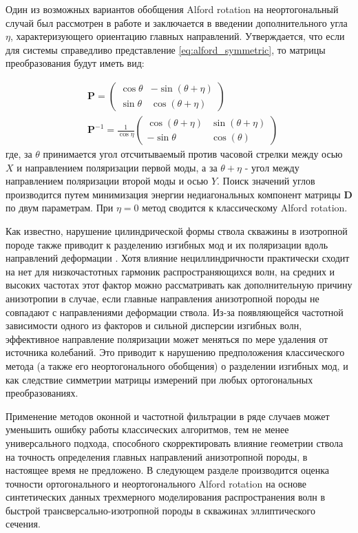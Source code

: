 \documentclass[a4paper,11pt]{article}
\begin{document}
Один из возможных вариантов обобщения Alford rotation на неортогональный случай был рассмотрен в работе \cite{Dellinger1998} и заключается в введении дополнительного угла $\eta$, характеризующего ориентацию главных направлений. Утверждается, что если для системы справедливо представление \eqref{eq:alford_symmetric}, то матрицы преобразования будут иметь вид:

\begin{align*}
&\mathbf{P} = \left(
\begin{array}{cc}
\cos \theta & -\sin (\theta+\eta) \\ 
\sin \theta & \cos (\theta+\eta)
\end{array} 
\right) \\
&\mathbf{P}^{-1} = \frac{1}{\cos \eta} \left(
\begin{array}{cc}
\cos (\theta+\eta) & \sin (\theta+\eta) \\ 
-\sin \theta & \cos (\theta)
\end{array} 
\right)
\end{align*}
где, за $\theta$ принимается угол отсчитываемый против часовой стрелки между осью $X$ и направлением поляризации первой моды, а за $\theta + \eta$ - угол между направлением поляризации второй моды и осью $Y$. Поиск значений углов производится путем минимизация энергии недиагональных компонент матрицы $\mathbf{D}$ по двум параметрам. При $\eta=0$ метод сводится к классическому Alford rotation. 

Как известно, нарушение цилиндрической формы ствола скважины в изотропной породе также приводит к разделению изгибных мод и их поляризации вдоль направлений деформации \cite{Seroices2010}. Хотя влияние нециллиндричности практически сходит на нет для низкочастотных гармоник распространяющихся волн, на средних и высоких частотах этот фактор можно рассматривать как дополнительную причину анизотропии в случае, если главные направления анизотропной породы не совпадают с направлениями деформации ствола. Из-за появляющейся частотной зависимости одного из факторов и сильной дисперсии изгибных волн, эффективное направление поляризации может меняться по мере удаления от источника колебаний. Это приводит к нарушению предположения классического метода (а также его неортогонального обобщения) о разделении изгибных мод, и как следствие симметрии матрицы измерений при любых ортогональных преобразованиях. 

Применение методов оконной и частотной фильтрации в ряде случаев может уменьшить ошибку работы классических алгоритмов, тем не менее универсального подхода, способного скорректировать влияние геометрии ствола на точность определения главных направлений анизотропной породы, в настоящее время не предложено. В следующем разделе производится оценка точности ортогонального и неортогонального Alford rotation на основе синтетических данных трехмерного моделирования распространения волн в быстрой трансверсально-изотропной породы в скважинах эллиптического сечения.  
\end{document}

